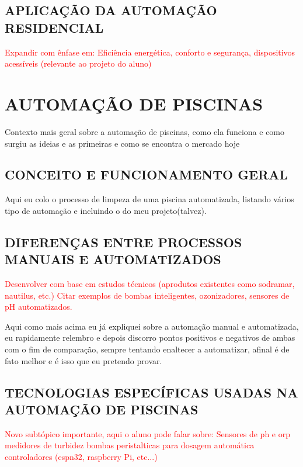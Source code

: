     
    \subsection{APLICAÇÃO DA AUTOMAÇÃO RESIDENCIAL}
        \textcolor{red}{Expandir com ênfase em: Eficiência energética, conforto e segurança, dispositivos acessíveis (relevante ao projeto do aluno)}
    
        
\section{AUTOMAÇÃO DE PISCINAS}

    Contexto mais geral sobre a automação de piscinas, como ela funciona e como surgiu as ideias e as primeiras e como se encontra o mercado hoje

    \subsection{CONCEITO E FUNCIONAMENTO GERAL}
        Aqui eu colo o processo de limpeza de uma piscina automatizada, listando vários tipo de automação e incluindo o do meu projeto(talvez).

    \subsection{DIFERENÇAS ENTRE PROCESSOS MANUAIS E AUTOMATIZADOS}

        \textcolor{red}{Desenvolver com base em estudos técnicos (aprodutos existentes como sodramar, nautilus, etc.) Citar exemplos de bombas inteligentes, ozonizadores, sensores de pH automatizados.}
    
        Aqui como mais acima eu já expliquei sobre a automação manual e automatizada, eu rapidamente relembro e depois discorro pontos positivos e negativos de ambas com o fim de comparação, sempre tentando enaltecer a automatizar, afinal é de fato melhor e é isso que eu pretendo provar.
    
    \subsection{TECNOLOGIAS ESPECÍFICAS USADAS NA AUTOMAÇÃO DE PISCINAS}
        \textcolor{red}{Novo subtópico importante, aqui o aluno pode falar sobre: 
        Sensores de ph e orp
        medidores de turbidez
        bombas peristalticas para dosagem automática
        controladores (espn32, raspberry Pi, etc...)}

